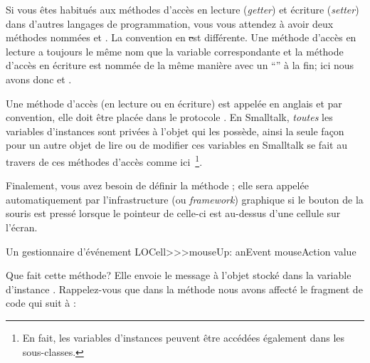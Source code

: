 \documentclass[a4paper,10pt,twoside]{book}
\begin{document}
Si vous \^etes habitués aux méthodes d'accès en lecture (\emph{getter})
et écriture (\emph{setter}) dans d'autres langages de programmation,
vous vous attendez à avoir deux méthodes nommées 
et .
La convention en \st est différente.
Une méthode d'accès en lecture a toujours le m\^eme nom que la variable
correspondante et la méthode d'accès en écriture est nommée de la m\^eme
manière avec un ``\ct{:}'' à la fin; ici nous avons donc
 et .

Une méthode d'accès (en lecture ou en écriture) est appelée
en anglais  et par convention, elle doit \^etre
placée dans le protocole .
En Smalltalk, \emph{toutes} les variables d'instances sont privées à
l'objet qui les possède, ainsi la seule façon pour un autre objet de
lire ou de modifier ces variables en Smalltalk se fait au travers de
ces méthodes d'accès comme ici~\footnote{En fait, les variables
  d'instances peuvent \^etre accédées également dans les sous-classes.}.


Finalement, vous avez besoin de définir la méthode ; elle
sera appelée automatiquement par l'infrastructure (ou \emph{framework})
graphique si le bouton de la souris est pressé lorsque le pointeur de
celle-ci est au-dessus d'une cellule sur l'écran.

\begin{method}[sbecellmouseup]{Un gestionnaire d'événement}
LOCell>>>mouseUp: anEvent
   mouseAction value
\end{method}


Que fait cette méthode? Elle envoie le message  à l'objet
stocké dans la variable d'instance . 
Rappelez-vous que dans la méthode 
nous avons affecté le fragment de code qui suit à :
\end{document}
